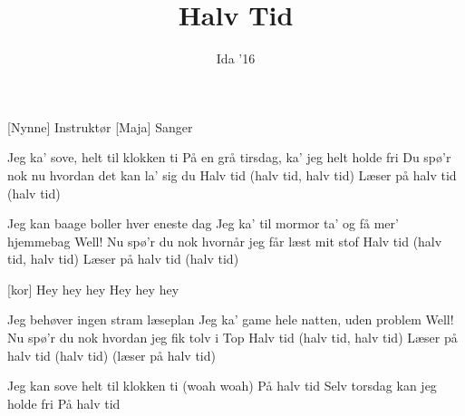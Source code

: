\documentclass[a4paper,11pt]{article}
\title{Halv Tid}
\author{Ida '16}
\begin{document}
\maketitle

\begin{roles}
[Nynne] Instruktør
[Maja] Sanger
\end{roles}

\begin{song}
 Jeg ka' sove, helt til klokken ti
På en grå tirsdag, ka' jeg helt holde fri
Du spø'r nok nu
hvordan det kan la' sig du
Halv tid (halv tid, halv tid)
Læser på halv tid (halv tid)

 Jeg kan baage boller hver eneste dag
Jeg ka' til mormor ta' og få mer' hjemmebag
Well! Nu spø'r du nok
hvornår jeg får læst mit stof
Halv tid (halv tid, halv tid)
Læser på halv tid (halv tid)

[kor] Hey hey hey
Hey hey hey

 Jeg behøver ingen stram læseplan
Jeg ka' game hele natten, uden problem
Well! Nu spø'r du nok
hvordan jeg fik tolv i Top
Halv tid (halv tid, halv tid)
Læser på halv tid (halv tid)
(læser på halv tid)

 Jeg kan sove helt til klokken ti (woah woah)
På halv tid
Selv torsdag kan jeg holde fri
På halv tid
\end{song}
\end{document}
